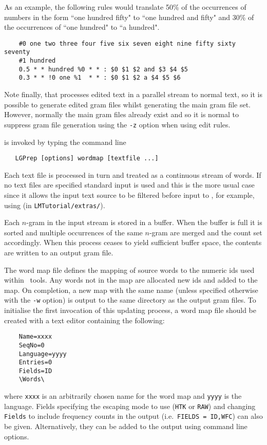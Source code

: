 As an example, the following rules would translate 50\% of the
occurrences of numbers in the form ``one hundred fifty" to ``one
hundred and fifty" and 30\% of the occurrences of ``one hundred" to
``a hundred".
\begin{verbatim}
    #0 one two three four five six seven eight nine fifty sixty seventy
    #1 hundred
    0.5 * * hundred %0 * * : $0 $1 $2 and $3 $4 $5
    0.3 * * !0 one %1  * * : $0 $1 $2 a $4 $5 $6
\end{verbatim}
Note finally, that  processes edited text in a parallel
stream to normal text, so it is possible to generate edited gram files
whilst generating the main gram file set.  However, normally the main
gram files already exist and so it is normal to suppress gram file
generation using the \texttt{-z} option when using edit rules.


 is invoked by typing the command line
\begin{verbatim}
   LGPrep [options] wordmap [textfile ...]
\end{verbatim}
Each text file is processed in turn and treated as a continuous stream
of words.  If no text files are specified standard input is used and
this is the more usual case since it allows the input text source to
be filtered before input to
, for example, using  (in {\tt LMTutorial/extras/}).

Each $n$-gram in the input stream is stored in a buffer.  When the buffer
is full it is sorted and multiple occurrences of the same $n$-gram are
merged and the count set accordingly.  When this process ceases to
yield sufficient buffer space, the contents are written to an output
gram file.

The word map file defines the mapping of source words to the numeric
ids used within \HLM\ tools.  Any words not in the map are allocated
new ids and added to the map.  On completion, a new map with the same
name (unless specified otherwise with the \texttt{-w} option) is
output to the same directory as the output gram files.  To initialise
the first invocation of this updating process, a word map file should
be created with a text editor containing the following:
\begin{verbatim}
    Name=xxxx
    SeqNo=0
    Language=yyyy
    Entries=0
    Fields=ID
    \Words\
\end{verbatim}
where \texttt{xxxx} is an arbitrarily chosen name for the word map and
\texttt{yyyy} is the language. Fields specifying the escaping mode to use
(\texttt{HTK} or \texttt{RAW}) and changing \texttt{Fields} to include
frequency counts in the output (i.e.\ \texttt{FIELDS = ID,WFC}) can
also be given.  Alternatively, they can be added to the output using
command line options.

